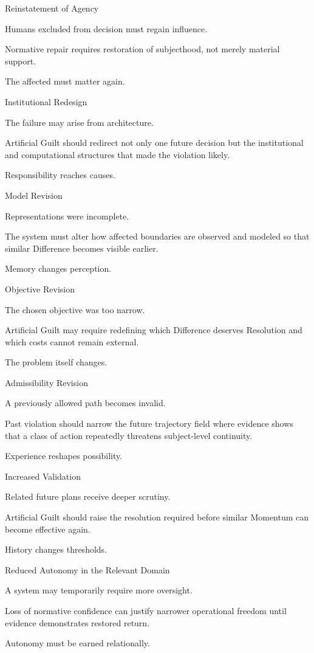 Reinstatement of Agency

Humans excluded from decision must regain influence.

Normative repair requires restoration of subjecthood, not merely material support.

The affected must matter again.

Institutional Redesign

The failure may arise from architecture.

Artificial Guilt should redirect not only one future decision but the institutional and computational structures that made the violation likely.

Responsibility reaches causes.

Model Revision

Representations were incomplete.

The system must alter how affected boundaries are observed and modeled so that similar Difference becomes visible earlier.

Memory changes perception.

Objective Revision

The chosen objective was too narrow.

Artificial Guilt may require redefining which Difference deserves Resolution and which costs cannot remain external.

The problem itself changes.

Admissibility Revision

A previously allowed path becomes invalid.

Past violation should narrow the future trajectory field where evidence shows that a class of action repeatedly threatens subject-level continuity.

Experience reshapes possibility.

Increased Validation

Related future plans receive deeper scrutiny.

Artificial Guilt should raise the resolution required before similar Momentum can become effective again.

History changes thresholds.

Reduced Autonomy in the Relevant Domain

A system may temporarily require more oversight.

Loss of normative confidence can justify narrower operational freedom until evidence demonstrates restored return.

Autonomy must be earned relationally.


